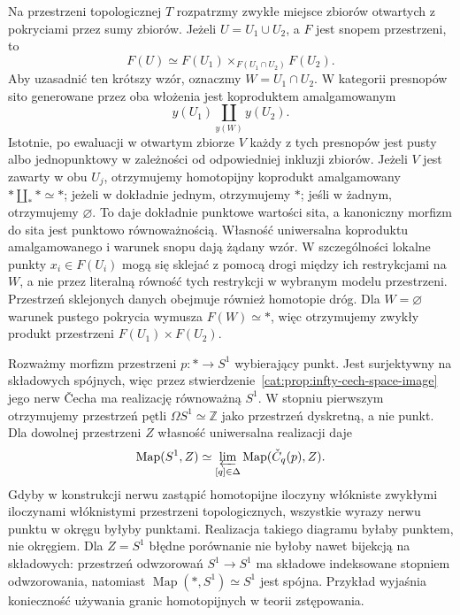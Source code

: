 \begin{przyklad}\label{cat:ex:infty-cech-two-opens}
Na przestrzeni topologicznej $T$ rozpatrzmy zwykłe miejsce zbiorów otwartych z pokryciami przez sumy zbiorów. Jeżeli $U=U_1\cup U_2$, a $F$ jest snopem przestrzeni, to
\[
 F(U)\simeq F(U_1)\times_{F(U_1\cap U_2)}F(U_2).
\]
Aby uzasadnić ten krótszy wzór, oznaczmy $W=U_1\cap U_2$. W kategorii presnopów sito generowane przez oba włożenia jest koproduktem amalgamowanym
\[
 y(U_1)\coprod_{y(W)}y(U_2).
\]
Istotnie, po ewaluacji w otwartym zbiorze $V$ każdy z tych presnopów jest pusty albo jednopunktowy w zależności od odpowiedniej inkluzji zbiorów. Jeżeli $V$ jest zawarty w obu $U_j$, otrzymujemy homotopijny koprodukt amalgamowany $*\coprod_* *\simeq *$; jeżeli w dokładnie jednym, otrzymujemy $*$; jeśli w żadnym, otrzymujemy $\varnothing$. To daje dokładnie punktowe wartości sita, a kanoniczny morfizm do sita jest punktowo równoważnością. Własność uniwersalna koproduktu amalgamowanego i warunek snopu dają żądany wzór. W szczególności lokalne punkty $x_i\in F(U_i)$ mogą się sklejać z pomocą drogi między ich restrykcjami na $W$, a nie przez literalną równość tych restrykcji w wybranym modelu przestrzeni. Przestrzeń sklejonych danych obejmuje również homotopie dróg. Dla $W=\varnothing$ warunek pustego pokrycia wymusza $F(W)\simeq *$, więc otrzymujemy zwykły produkt przestrzeni $F(U_1)\times F(U_2)$.
\end{przyklad}

\begin{przyklad}\label{cat:ex:infty-cech-point-circle}
Rozważmy morfizm przestrzeni $p:*\to S^1$ wybierający punkt. Jest surjektywny na składowych spójnych, więc przez stwierdzenie~\ref{cat:prop:infty-cech-space-image} jego nerw Čecha ma realizację równoważną $S^1$. W stopniu pierwszym otrzymujemy przestrzeń pętli $\Omega S^1\simeq\mathbb Z$ jako przestrzeń dyskretną, a nie punkt. Dla dowolnej przestrzeni $Z$ własność uniwersalna realizacji daje
\[
 \operatorname{Map}(S^1,Z)\simeq
 \varprojlim_{[q]\in\Delta}\operatorname{Map}(\check C_q(p),Z).
\]
Gdyby w konstrukcji nerwu zastąpić homotopijne iloczyny włókniste zwykłymi iloczynami włóknistymi przestrzeni topologicznych, wszystkie wyrazy nerwu punktu w okręgu byłyby punktami. Realizacja takiego diagramu byłaby punktem, nie okręgiem. Dla $Z=S^1$ błędne porównanie nie byłoby nawet bijekcją na składowych: przestrzeń odwzorowań $S^1\to S^1$ ma składowe indeksowane stopniem odwzorowania, natomiast $\operatorname{Map}(*,S^1)\simeq S^1$ jest spójna. Przykład wyjaśnia konieczność używania granic homotopijnych w teorii zstępowania.
\end{przyklad}


